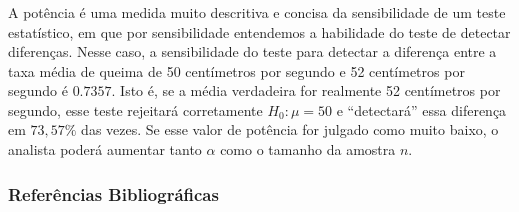 \documentclass[14pt,aspectratio=1610]{beamer}
\newcommand{\Ho}{\ensuremath{H_{0}}}
\begin{document}
\begin{frame}{}
\frametitle{}
\begin{block}{}
\justifying
A potência é uma medida muito descritiva e concisa da sensibilidade de um teste estatístico, em que por sensibilidade entendemos a habilidade do teste de detectar 
diferenças. Nesse caso, a sensibilidade do teste para detectar a diferença entre a taxa média de queima de 50 centímetros por segundo e 52 centímetros por segundo é 
$0.7357.$ Isto é, se a média verdadeira for realmente 52 centímetros por segundo, esse teste rejeitará corretamente $\Ho: \mu = 50$ e ``detectará'' essa diferença em 
$73,57\%$ das vezes. Se esse valor de potência for julgado como muito baixo, o analista poderá aumentar tanto $\alpha$ como o tamanho da amostra $n.$

\end{block}
\end{frame}

\begin{frame}{}
\frametitle{Referências Bibliográficas}

\end{frame}
\end{document}
